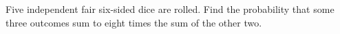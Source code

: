 Five independent fair six-sided dice are rolled. Find the probability that some three outcomes sum to eight times the sum of the other two.
